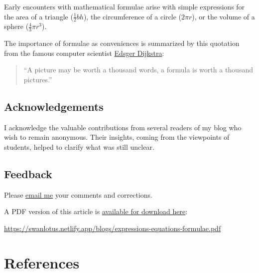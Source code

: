 \documentclass[
  a4paper,
]{article}
\begin{document}
Early encounters with mathematical formulae arise with simple
expressions for the area of a triangle (\(\frac{1}{2}bh\)), the
circumference of a circle (\(2\pi r\)), or the volume of a sphere
(\(\frac{4}{3}\pi r^3\)).

The importance of formulae as conveniences is summarized by this
quotation from the famous computer scientist
\href{https://en.wikipedia.org/wiki/Edsger_W._Dijkstra}{Edsger
Dijkstra}:

\begin{quote}
``A picture may be worth a thousand words, a formula is worth a thousand
pictures.''
\end{quote}

\subsection{Acknowledgements}\label{acknowledgements}

I acknowledge the valuable contributions from several readers of my blog
who wish to remain anonymous. Their insights, coming from the viewpoints
of students, helped to clarify what was still unclear.

\subsection{Feedback}\label{feedback}

Please \href{mailto:feedback.swanlotus@gmail.com}{email me} your
comments and corrections.

\noindent A PDF version of this article is
\href{./expressions-equations-formulae.pdf}{available for download
here}:

\begin{small}

\begin{sffamily}

\url{https://swanlotus.netlify.app/blogs/expressions-equations-formulae.pdf}

\end{sffamily}

\end{small}

\section*{References}\label{bibliography}
\end{document}
